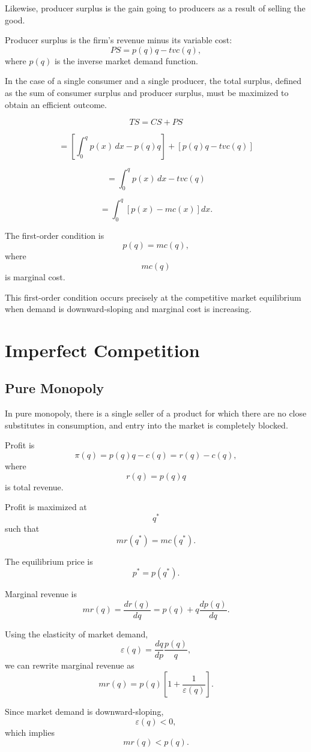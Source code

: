 Likewise, producer surplus is the gain going to producers as a result of selling the good.

Producer surplus is the firm's revenue minus its variable cost:
\[
PS
=
p(q)q-tvc(q),
\]
where \(p(q)\) is the inverse market demand function.

In the case of a single consumer and a single producer, the total surplus, defined as the sum of consumer surplus and producer surplus, must be maximized to obtain an efficient outcome.



\[
TS
=
CS+PS
\]

\[
=
\left[
\int_0^q p(x)\,dx-p(q)q
\right]
+
\left[
p(q)q-tvc(q)
\right]
\]

\[
=
\int_0^q p(x)\,dx-tvc(q)
\]

\[
=
\int_0^q
\left[
p(x)-mc(x)
\right]dx.
\]

The first-order condition is
\[
p(q)=mc(q),
\]
where
\[
mc(q)
\]
is marginal cost.

This first-order condition occurs precisely at the competitive market equilibrium when demand is downward-sloping and marginal cost is increasing.

\section{Imperfect Competition}

\subsection{Pure Monopoly}

In pure monopoly, there is a single seller of a product for which there are no close substitutes in consumption, and entry into the market is completely blocked.

Profit is
\[
\pi(q)
=
p(q)q-c(q)
=
r(q)-c(q),
\]
where
\[
r(q)=p(q)q
\]
is total revenue.

Profit is maximized at
\[
q^*
\]
such that
\[
mr(q^*)=mc(q^*).
\]

The equilibrium price is
\[
p^*=p(q^*).
\]

Marginal revenue is
\[
mr(q)
=
\frac{dr(q)}{dq}
=
p(q)+q\frac{dp(q)}{dq}.
\]

Using the elasticity of market demand,
\[
\varepsilon(q)
=
\frac{dq}{dp}\frac{p(q)}{q},
\]
we can rewrite marginal revenue as
\[
mr(q)
=
p(q)
\left[
1+\frac{1}{\varepsilon(q)}
\right].
\]

Since market demand is downward-sloping,
\[
\varepsilon(q)<0,
\]
which implies
\[
mr(q)<p(q).
\]

